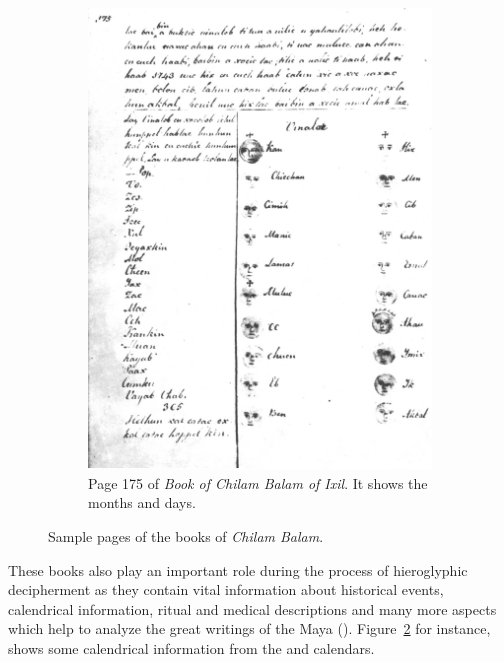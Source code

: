 \documentclass[../main.tex]{subfiles}
\begin{document}
\begin{figure}[ht]
\begin{subfigure}[b]{0.49\textwidth}
        \includegraphics[width=\textwidth]{img/chilam-balam-of-ixil-page-175}
        \caption{Page 175 of \emph{Book of Chilam Balam of Ixil}.
                 It shows the \haab months and \tzolkin days.}
        \label{fig:introduction-chilam-balam-of-ixil-page-175}
    \end{subfigure}
    \caption{Sample pages of the books of \emph{Chilam Balam}.}
\end{figure}

These books also play an important role during the process of hieroglyphic decipherment as they 
contain vital information about historical events, calendrical information, ritual and 
medical descriptions and many more aspects which help to analyze the great writings of the 
Maya (\cite[3\psq]{roys1933}).
Figure~\ref{fig:introduction-chilam-balam-of-ixil-page-175} for instance, shows some 
calendrical information from the \tzolkin and \haab calendars.
\end{document}
